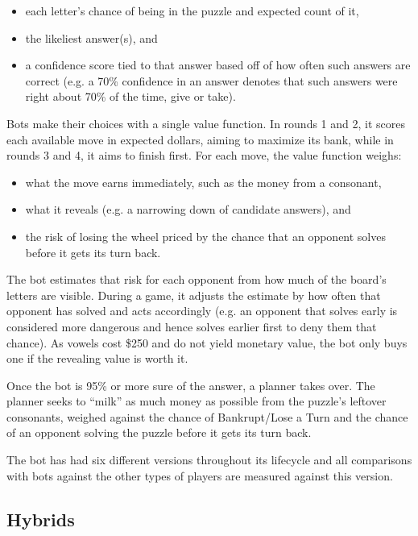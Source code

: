 \begin{itemize}
  \item each letter's chance of being in the puzzle and expected count of it,
  \item the likeliest answer(s), and
  \item a confidence score tied to that answer based off of how often such answers are correct (e.g. a 70\% confidence in an answer denotes that such answers were right about 70\% of the time, give or take).
\end{itemize}

Bots make their choices with a single value function. In rounds 1 and 2, it scores each available move in expected dollars, aiming to maximize its bank, while in rounds 3 and 4, it aims to finish first. For each move, the value function weighs:

\begin{itemize}
  \item what the move earns immediately, such as the money from a consonant,
  \item what it reveals (e.g. a narrowing down of candidate answers), and
  \item the risk of losing the wheel priced by the chance that an opponent solves before it gets its turn back.
\end{itemize}

The bot estimates that risk for each opponent from how much of the board's letters are visible. During a game, it adjusts the estimate by how often that opponent has solved and acts accordingly (e.g. an opponent that solves early is considered more dangerous and hence solves earlier first to deny them that chance). As vowels cost \$250 and do not yield monetary value, the bot only buys one if the revealing value is worth it.

Once the bot is 95\% or more sure of the answer, a planner takes over. The planner seeks to ``milk'' as much money as possible from the puzzle's leftover consonants, weighed against the chance of Bankrupt/Lose a Turn and the chance of an opponent solving the puzzle before it gets its turn back.

The bot has had six different versions throughout its lifecycle and all comparisons with bots against the other types of players are measured against this version.

\subsection{Hybrids}

